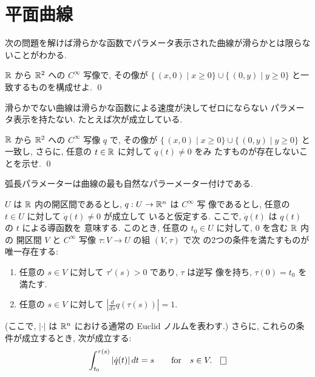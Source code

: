 \documentclass[12pt,twoside]{jarticle}
\begin{document}

\section{平面曲線}

次の問題を解けば滑らかな函数でパラメータ表示された曲線が滑らかとは限らな
いことがわかる.

\begin{question}
  ${\mathbb R}$ から ${\mathbb R}^2$ への $C^\infty$ 写像で, その像が
  \(
    \{\, (x, 0) \mid x \ge 0 \}
    \cup
    \{\, (0, y) \mid y \ge 0 \}
  \)
  と一致するものを構成せよ. \qed
\end{question}

滑らかでない曲線は滑らかな函数による速度が決してゼロにならない
パラメータ表示を持たない. たとえば次が成立している.

\begin{question}
  ${\mathbb R}$ から ${\mathbb R}^2$ への $C^\infty$ 写像 $q$ で, その像が
  \(
    \{\, (x, 0) \mid x \ge 0 \}
    \cup
    \{\, (0, y) \mid y \ge 0 \}
  \)%
  と一致し, さらに, 任意の $t \in {\mathbb R}$ に対して $\dot{q}(t)\ne 0$ をみ
  たすものが存在しないことを示せ. \qed
\end{question}

弧長パラメーターは曲線の最も自然なパラーメーター付けである.

\begin{question}[弧長パラメーター]\label{q:alp}
  $U$ は ${\mathbb R}$ 内の開区間であるとし, $q : U \to {\mathbb R}^n$ は $C^\infty$ 写
  像であるとし, 任意の $t\in U$ に対して $\dot{q}(t) \ne 0$ が成立して
  いると仮定する. ここで, $\dot{q}(t)$ は $q(t)$ の $t$ による導函数を
  意味する. このとき, 任意の $t_0\in U$ に対して, $0$ を含む ${\mathbb R}$ 内の
  開区間 $V$ と $C^\infty$ 写像 $\tau : V \to U$ の組 $(V, \tau)$ で次
  の2つの条件を満たすものが唯一存在する:
  \begin{enumerate}
  \item 任意の $s \in V$ に対して $\tau'(s) > 0$ であり, $\tau$ は逆写
    像を持ち, $\tau(0) = t_0$ を満たす.
  \item 任意の $s \in V$ に対して 
    $\displaystyle \left| \frac{d}{ds}q(\tau(s)) \right| = 1$.
  \end{enumerate}
  (ここで, $|\cdot|$ は ${\mathbb R}^n$ における通常の Euclid ノルムを表わす.) 
  さらに, これらの条件が成立するとき, 次が成立する:
  \[
    \int_{t_0}^{\tau(s)} |\dot{q}(t)| \,dt = s
    \qquad\text{for}\quad s \in V.
    \qed
  \]
\end{question}
\end{document}
